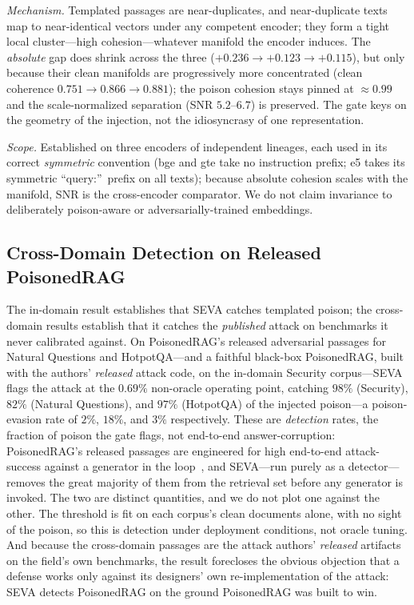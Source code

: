 \documentclass[conference]{IEEEtran}
\begin{document}
\emph{Mechanism.} Templated passages are near-duplicates, and near-duplicate texts map
to near-identical vectors under any competent encoder; they form a tight local
cluster---high cohesion---whatever manifold the encoder induces. The \emph{absolute}
gap does shrink across the three ($+0.236 \to +0.123 \to +0.115$), but only because
their clean manifolds are progressively more concentrated (clean coherence
$0.751 \to 0.866 \to 0.881$); the poison cohesion stays pinned at $\approx 0.99$ and
the scale-normalized separation (SNR $5.2$--$6.7$) is preserved. The gate keys on the
geometry of the injection, not the idiosyncrasy of one representation.

\emph{Scope.} Established on three encoders of independent lineages, each used in its
correct \emph{symmetric} convention (bge and gte take no instruction prefix; e5 takes
its symmetric ``query:''\ prefix on all texts); because absolute cohesion scales with
the manifold, SNR is the cross-encoder comparator. We do not claim invariance to
deliberately poison-aware or adversarially-trained embeddings.

\subsection{Cross-Domain Detection on Released PoisonedRAG}
The in-domain result establishes that SEVA catches templated poison; the
cross-domain results establish that it catches the \emph{published} attack on
benchmarks it never calibrated against. On PoisonedRAG's released adversarial
passages for Natural Questions and HotpotQA---and a faithful black-box PoisonedRAG,
built with the authors' \emph{released} attack code, on the in-domain Security
corpus---SEVA flags
the attack at the $0.69\%$ non-oracle operating point, catching $98\%$ (Security),
$82\%$ (Natural Questions), and $97\%$ (HotpotQA) of the injected poison---a poison-evasion rate of $2\%$, $18\%$, and $3\%$
respectively. These are \emph{detection} rates, the fraction of poison the gate
flags, not end-to-end answer-corruption: PoisonedRAG's released passages are
engineered for high end-to-end attack-success against a generator in the
loop~\cite{poisonedrag}, and SEVA---run purely as a detector---removes the great
majority of them from the retrieval set before any generator is invoked. The two are
distinct quantities, and we do not plot one against the other.
The threshold is fit on each corpus's clean documents alone, with no sight of the
poison, so this is detection under deployment conditions, not oracle tuning. And
because the cross-domain passages are the attack authors' \emph{released} artifacts
on the field's own benchmarks, the result forecloses the obvious objection that a
defense works only
against its designers' own re-implementation of the attack: SEVA detects
PoisonedRAG on the ground PoisonedRAG was built to win.
\end{document}
